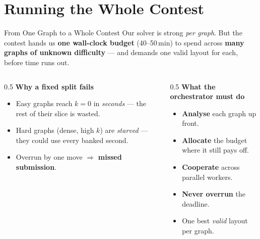 \section{Running the Whole Contest}

\begin{frame}{From One Graph to a Whole Contest}
  Our solver is strong \emph{per graph}. But the contest hands us \textbf{one
  wall-clock budget} (40--50\,min) to spend across \textbf{many graphs of unknown
  difficulty} --- and demands one valid layout for each, before time runs out.
  \medskip
  \begin{columns}[T]
    \begin{column}{0.5\textwidth}
      \textbf{Why a fixed split fails}
      \begin{itemize}
        \item Easy graphs reach $k{=}0$ in \emph{seconds} --- the rest of their
              slice is wasted.
        \item Hard graphs (dense, high $k$) are \emph{starved} --- they could use
              every banked second.
        \item Overrun by one move $\Rightarrow$ \textbf{missed submission}.
      \end{itemize}
    \end{column}
    \begin{column}{0.5\textwidth}
      \textbf{What the orchestrator must do}
      \begin{itemize}
        \item[\textcolor{accent}{\textbf{1}}] \textbf{Analyse} each graph up front.
        \item[\textcolor{accent}{\textbf{2}}] \textbf{Allocate} the budget where it
              still pays off.
        \item[\textcolor{accent}{\textbf{3}}] \textbf{Cooperate} across parallel workers.
        \item[\textcolor{accent}{\textbf{4}}] \textbf{Never overrun} the deadline.
        \item[\textcolor{accent}{\textbf{5}}] One best \emph{valid} layout per graph.
      \end{itemize}
    \end{column}
  \end{columns}
\end{frame}

